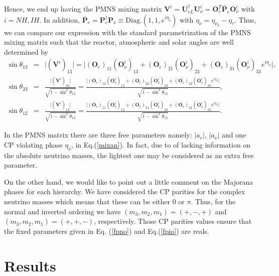 \documentclass[aps,prd,groupaddress,floatfix,tighten,nofootinbib,showpacs,amsfonts,superscriptaddress]{revtex4-2}
\newcommand{\nn}{\nonumber}
\begin{document}
Hence, we end up having the PMNS mixing matrix $\mathbf{V}^{i}=\mathbf{U}^{\dagger}_{e L}\mathbf{U}^{i}_{\nu}=\mathbf{O}^{T}_{e}\bar{\mathbf{P}}_{e}\mathbf{O}^{i}_{\nu}$ with $i= NH, IH$. In addition, $\bar{\mathbf{P}}_{e}=\mathbf{P}^{\dagger}_{e}\mathbf{P}_{\nu}\equiv\textrm{Diag.}(1, 1,e^{i\eta_{\nu}})$ with $\eta_{\nu}=\eta_{\nu_{3}}-\eta_{\tau}$. Thus, we can compare our expression with the standard parametrization of the PMNS mixing matrix such that the reactor, atmospheric and solar angles are well determined by
\begin{eqnarray}\label{mixan}
\sin{\theta}_{13}&=&\vert (\mathbf{V}^{i})_{13}\vert=\vert (\mathbf{O}_{e})_{11} (\mathbf{O}^{i}_{\nu})_{13}+(\mathbf{O}_{e})_{21} (\mathbf{O}^{i}_{\nu})_{23}+(\mathbf{O}_{e})_{31} (\mathbf{O}^{i}_{\nu})_{33}e^{i\eta_{\nu}}
\vert, \nn\\
\sin{\theta}_{23}&=&\frac{\vert (\mathbf{V}^{i})_{23}\vert}{\sqrt{1-\sin^{2}{\theta}_{13}}}=\frac{\vert  (\mathbf{O}_{e})_{12} (\mathbf{O}^{i}_{\nu})_{13}+(\mathbf{O}_{e})_{22} (\mathbf{O}^{i}_{\nu})_{23}+(\mathbf{O}_{e})_{32} (\mathbf{O}^{i}_{\nu})_{33}e^{i\eta_{\nu}} \vert}{\sqrt{1-\sin^{2}{\theta}_{13}}},\nn\\
\sin{\theta}_{12}&=&\frac{\vert (\mathbf{V}^{i})_{12}\vert}{\sqrt{1-\sin^{2}{\theta}_{13}}}=\frac{\vert (\mathbf{O}_{e})_{11} (\mathbf{O}^{i}_{\nu})_{12}+(\mathbf{O}_{e})_{21} (\mathbf{O}^{i}_{\nu})_{22}+(\mathbf{O}_{e})_{31} (\mathbf{O}^{i}_{\nu})_{32}e^{i\eta_{\nu}}
\vert}{\sqrt{1-\sin^{2}{\theta}_{13}}}.
\end{eqnarray}

In the PMNS matrix there are three free parameters namely: $\vert a_{e}\vert$, $\vert a_{\nu}\vert$ and one CP violating phase $\eta_{\nu}$, in Eq.(\ref{mixan}). In fact, due to of lacking information on the absolute neutrino masses, the lightest one may be considered as an extra free parameter.


On the other hand, we would like to point out a little comment on the Majorana phases for each hierarchy. We have considered the CP parities for the complex neutrino masses which means that these can be either $0$ or $\pi$. Thus, for the normal and inverted ordering we have $(m_{3}, m_{2}, m_{1})=(+,-,+)$ and $(m_{3}, m_{2}, m_{1})=(+,+,-)$, respectively. Those CP parities values ensure that the fixed parameters given in Eq. (\ref{fpno}) and Eq.(\ref{fpio}) are reals.




\section{Results}
\end{document}
